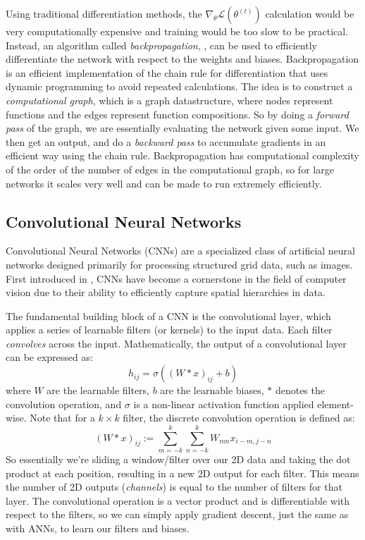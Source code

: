 Using traditional differentiation methods, the $\nabla_\theta \mathcal{L}(\theta^{(t)})$ calculation would be very computationally
expensive and training would be too slow to be practical. Instead, an algorithm called \textit{backpropagation}, \cite{RUMELHART1986},
can be used to efficiently differentiate the network with respect to the weights and biases. 
Backpropagation is an efficient implementation of the chain rule for differentiation that uses
dynamic programming to avoid repeated calculations. The idea is to construct a \textit{computational graph},
which is a graph datastructure, where nodes represent functions and the edges represent function compositions.
So by doing a \textit{forward pass} of the graph, we are essentially evaluating the network given some input.
We then get an output, and do a \textit{backward pass} to accumulate gradients in an efficient way using the chain rule.
Backpropagation has computational complexity of the order of the number of edges in the computational graph,
so for large networks it scales very well and can be made to run extremely efficiently.

\subsection{Convolutional Neural Networks}

Convolutional Neural Networks (CNNs) are a specialized class of artificial neural 
networks designed primarily for processing structured grid data, such as images.
First introduced in \cite{LECUN1998}, CNNs have become a cornerstone in the field of
computer vision due to their ability to efficiently capture spatial hierarchies in data.

The fundamental building block of a CNN is the convolutional layer, which applies a
series of learnable filters (or kernels) to the input data.
Each filter \textit{convolves} across the input.
Mathematically, the output of a convolutional layer can be expressed as:
\begin{equation}
    h_{ij} = \sigma\left((W * x)_{ij} + b\right)
\end{equation}
where $W$ are the learnable filters, $b$ are the learnable biases,
$*$ denotes the convolution operation, and $\sigma$ is a non-linear 
activation function applied element-wise.
Note that for a $k\times k$ filter, the discrete convolution operation is defined as:
\begin{equation}
    (W * x)_{ij} := \sum_{m=-k}^{k}\sum_{n=-k}^{k} W_{mn} x_{i-m, j-n}
\end{equation}
So essentially we're sliding a window/filter over our 2D data and taking the dot product
at each position, resulting in a new 2D output for each filter.
This means the number of 2D outputs (\textit{channels}) is equal to the number of filters
for that layer.
The convolutional operation is a vector product and is differentiable with respect to
the filters, so we can simply apply gradient descent, just the same as with ANNs,
to learn our filters and biases.

